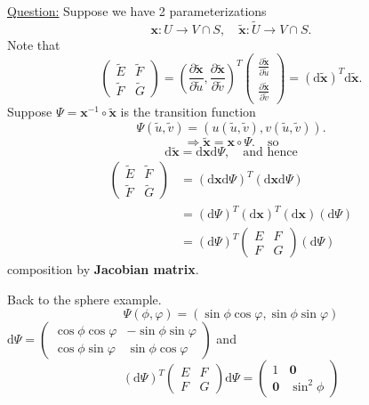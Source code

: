 \documentclass{article}
\begin{document}
\noindent \underline{Question:}
Suppose we have 2 parameterizations
\[
\mathbf{x}: U \to V \cap S, \quad \mathbf{\tilde{x}}: \tilde{U} \to V \cap S.
\]
Note that
\[
\begin{pmatrix} \tilde{E} & \tilde{F} \\ \tilde{F} & \tilde{G} \end{pmatrix} = \left( \frac{\partial \mathbf{\tilde{x}}}{\partial \tilde{u}}, \frac{\partial \mathbf{\tilde{x}}}{\partial \tilde{v}} \right)^T \begin{pmatrix} \frac{\partial \mathbf{\tilde{x}}}{\partial \tilde{u}} \\ \frac{\partial \mathbf{\tilde{x}}}{\partial \tilde{v}} \end{pmatrix}
= (\mathrm{d}\mathbf{\tilde{x}})^T \mathrm{d}\mathbf{\tilde{x}}.
\]
Suppose $\Psi = \mathbf{x}^{-1} \circ \mathbf{\tilde{x}}$ is the transition function
\[
\Psi(\tilde{u}, \tilde{v}) = (u(\tilde{u}, \tilde{v}), v(\tilde{u}, \tilde{v})).
\]
\[
\Rightarrow \mathbf{\tilde{x}} = \mathbf{x} \circ \Psi. \quad \text{so}
\]
\[
\mathrm{d}\mathbf{\tilde{x}} = \mathrm{d}\mathbf{x} \mathrm{d}\Psi, \quad \text{and hence}
\]
\begin{align*}
\begin{pmatrix} \tilde{E} & \tilde{F} \\ \tilde{F} & \tilde{G} \end{pmatrix} &= (\mathrm{d}\mathbf{x} \mathrm{d}\Psi)^T (\mathrm{d}\mathbf{x} \mathrm{d}\Psi) \\
&= (\mathrm{d}\Psi)^T (\mathrm{d}\mathbf{x})^T (\mathrm{d}\mathbf{x}) (\mathrm{d}\Psi) \\
&= (\mathrm{d}\Psi)^T \begin{pmatrix} E & F \\ F & G \end{pmatrix} (\mathrm{d}\Psi)
\end{align*}
composition by \textbf{Jacobian matrix}.

\begin{example} Back to the sphere example.
\[
\Psi(\phi, \varphi) = (\sin \phi \cos \varphi, \sin \phi \sin \varphi)
\]
$\mathrm{d}\Psi = \begin{pmatrix}
\cos\phi \cos\varphi & -\sin\phi \sin\varphi \\
\cos\phi \sin\varphi & \sin\phi \cos\varphi
\end{pmatrix}$
and
\[
(\mathrm{d}\Psi)^T \begin{pmatrix} E & F \\ F & G \end{pmatrix} \mathrm{d}\Psi = \begin{pmatrix} 1 & \mathbf{0} \\ \mathbf{0} & \sin^2 \phi \end{pmatrix}
\]
\end{example}
\end{document}
